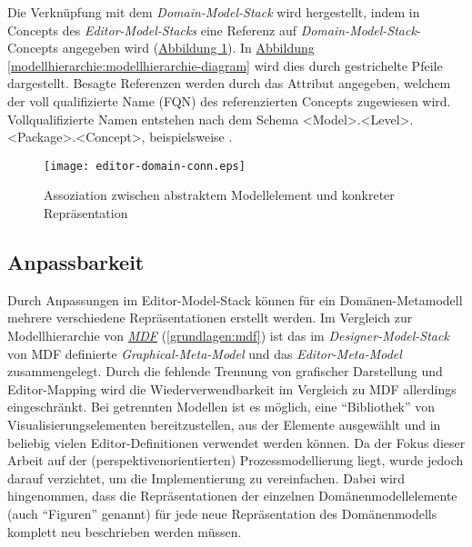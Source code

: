 \documentclass[a4paper,10pt]{sphinxmanual}
\begin{document}
Die Verknüpfung mit dem \emph{Domain-Model-Stack} wird hergestellt, indem in Concepts des \emph{Editor-Model-Stacks} eine Referenz auf \emph{Domain-Model-Stack}-Concepts angegeben wird (\hyperref[modellhierarchie:editor-domain-conn]{Abbildung  \ref*{modellhierarchie:editor-domain-conn}}).
In \hyperref[modellhierarchie:modellhierarchie-diagram]{Abbildung  \ref*{modellhierarchie:modellhierarchie-diagram}} wird dies durch gestrichelte Pfeile dargestellt.
Besagte Referenzen werden durch das Attribut  angegeben, welchem der voll qualifizierte Name (FQN) des referenzierten Concepts zugewiesen wird.
Vollqualifizierte Namen entstehen nach dem Schema \textless{}Model\textgreater{}.\textless{}Level\textgreater{}.\textless{}Package\textgreater{}.\textless{}Concept\textgreater{}, beispielsweise .
\begin{figure}[htbp]
\centering
\capstart

\texttt{[image: editor-domain-conn.eps]}
\caption{Assoziation zwischen abstraktem Modellelement und konkreter Repräsentation}\label{modellhierarchie:editor-domain-conn}\end{figure}


\subsection{Anpassbarkeit}
\label{modellhierarchie:anpassbarkeit}
Durch Anpassungen im Editor-Model-Stack können für ein Domänen-Metamodell mehrere verschiedene Repräsentationen erstellt werden.
Im Vergleich zur Modellhierarchie von {\hyperref[grundlagen:mdf]{\emph{MDF}}} (\autoref*{grundlagen:mdf}) ist das im \emph{Designer-Model-Stack} von MDF definierte \emph{Graphical-Meta-Model} und das \emph{Editor-Meta-Model} zusammengelegt.
Durch die fehlende Trennung von grafischer Darstellung und Editor-Mapping wird die Wiederverwendbarkeit im Vergleich zu MDF allerdings eingeschränkt.
Bei getrennten Modellen ist es möglich, eine "`Bibliothek"' von Visualisierungselementen bereitzustellen, aus der Elemente ausgewählt und in beliebig vielen Editor-Definitionen verwendet werden können.
Da der Fokus dieser Arbeit auf der (perspektivenorientierten) Prozessmodellierung liegt, wurde jedoch darauf verzichtet, um die Implementierung zu vereinfachen.
Dabei wird hingenommen, dass die Repräsentationen der einzelnen Domänenmodellelemente (auch "`Figuren"' genannt) für jede neue Repräsentation des Domänenmodells komplett neu beschrieben werden müssen.
\end{document}
